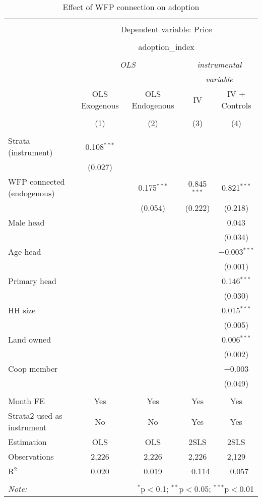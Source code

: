 
\begin{table}[!htbp] \centering 
  \caption{Effect of WFP connection on adoption} 
  \label{tab:adoption} 
\begin{tabular}{@{\extracolsep{5pt}}lcccc} 
\\[-1.8ex]\hline 
\hline \\[-1.8ex] 
 & \multicolumn{4}{c}{Dependent variable: Price} \\ 
\cline{2-5} 
\\[-1.8ex] & \multicolumn{4}{c}{adoption\_index} \\ 
\\[-1.8ex] & \multicolumn{2}{c}{\textit{OLS}} & \multicolumn{2}{c}{\textit{instrumental}} \\ 
 & \multicolumn{2}{c}{\textit{}} & \multicolumn{2}{c}{\textit{variable}} \\ 
 & OLS Exogenous & OLS Endogenous & IV & IV + Controls \\ 
\\[-1.8ex] & (1) & (2) & (3) & (4)\\ 
\hline \\[-1.8ex] 
 Strata (instrument) & 0.108$^{***}$ &  &  &  \\ 
  & (0.027) &  &  &  \\ 
  WFP connected (endogenous) &  & 0.175$^{***}$ & 0.845$^{***}$ & 0.821$^{***}$ \\ 
  &  & (0.054) & (0.222) & (0.218) \\ 
  Male head &  &  &  & 0.043 \\ 
  &  &  &  & (0.034) \\ 
  Age head &  &  &  & $-$0.003$^{***}$ \\ 
  &  &  &  & (0.001) \\ 
  Primary head &  &  &  & 0.146$^{***}$ \\ 
  &  &  &  & (0.030) \\ 
  HH size &  &  &  & 0.015$^{***}$ \\ 
  &  &  &  & (0.005) \\ 
  Land owned &  &  &  & 0.006$^{***}$ \\ 
  &  &  &  & (0.002) \\ 
  Coop member &  &  &  & $-$0.003 \\ 
  &  &  &  & (0.049) \\ 
 \hline \\[-1.8ex] 
Month FE & Yes & Yes & Yes & Yes \\ 
Strata2 used as instrument & No & No & Yes & Yes \\ 
Estimation & OLS & OLS & 2SLS & 2SLS \\ 
Observations & 2,226 & 2,226 & 2,226 & 2,129 \\ 
R$^{2}$ & 0.020 & 0.019 & $-$0.114 & $-$0.057 \\ 
\hline 
\hline \\[-1.8ex] 
\textit{Note:}  & \multicolumn{4}{r}{$^{*}$p$<$0.1; $^{**}$p$<$0.05; $^{***}$p$<$0.01} \\ 
\end{tabular} 
\end{table} 
